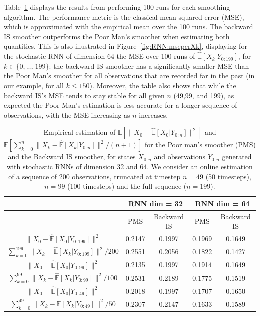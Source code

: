 \documentclass[12pt]{article}
\newcounter{example}[section]
\begin{document}
Table~\ref{table:RNN_exp} displays the results from performing 100 runs for each smoothing algorithm. 
The performance metric is the classical mean squared error (MSE), which is approximated with the empirical mean over the 100 runs.
The backward IS smoother outperforms the Poor Man's smoother when estimating both quantities. 
This is also illustrated in Figure~\ref{fig:RNN:mseperXk}, displaying for the stochastic RNN of dimension $64$ the MSE over 100 runs of $\mathbb{\widehat{E}}[X_k|Y_{0:199}]$, for $k \in \{0,...,199\}$: the backward IS smoother has a significantly  smaller MSE than the Poor Man's smoother for all observations that are recorded far in the past (in our example, for all $k \leqslant 150$).  
Moreover, the table also shows that while the backward IS's MSE tends to stay stable for all given $n$ (49,99, and 199), as expected the Poor Man's estimation is less accurate for a longer sequence of observations, with the MSE increasing as $n$ increases.

\begin{table}
\caption{Empirical estimation of $\mathbb{E}[\|X_0 - \mathbb{\widehat{E}}[X_0|Y_{0:n}]\|^2]$ and $\mathbb{E}[ \sum_{k=0}^{n}\|X_k - \mathbb{\widehat{E}}[X_k|Y_{0:n}]\|^2/(n+1)]$ for the Poor man's smoother (PMS) and the Backward IS smoother, for states $X_{0:n}$ and observations $Y_{0:n}$ generated with stochastic RNNs of dimension 32 and 64. We consider an online estimation of a sequence of 200 observations, truncated at timestep $n=49$ (50 timesteps), $n=99$ (100 timesteps) and the full sequence ($n=199$).}
\label{table:RNN_exp}
\centering 
\begin{tabular}{c|cc|cc}
 & \multicolumn{2}{c}{RNN dim = 32} & \multicolumn{2}{c}{RNN dim = 64} \\\toprule
\hline
 &  PMS & Backward IS &  PMS & Backward IS \\
\hline
$\|X_0 - \mathbb{\widehat{E}}[X_0|Y_{0:199}]\|^2$ & 0.2147 & 0.1997 & 0.1969 & 0.1649\\
$ \sum_{k=0}^{199} \|X_k - \mathbb{\widehat{E}}[X_k|Y_{0:199}]\|^2/200$ & 0.2551 & 0.2056  & 0.1822 & 0.1427 \\
\hline
$\|X_0 - \mathbb{\widehat{E}}[X_0|Y_{0:99}]\|^2$ & 0.2135 & 0.1997 & 0.1914 & 0.1649 \\
$ \sum_{k=0}^{99} \|X_k - \mathbb{\widehat{E}}[X_k|Y_{0:99}]\|^2/100$ & 0.2531 & 0.2189 & 0.1775 & 0.1519\\
\hline
$\|X_0 - \mathbb{\widehat{E}}[X_0|Y_{0:49}]\|^2$ & 0.2018 & 0.1997 & 0.1707 & 0.1650\\
$\sum_{k=0}^{49} \|X_k - \mathbb{\widehat{E}}[X_k|Y_{0:49}]\|^2/50$ & 0.2307 & 0.2147 & 0.1633 & 0.1589\\
\hline
\bottomrule
\end{tabular}
\end{table}
\end{document}
